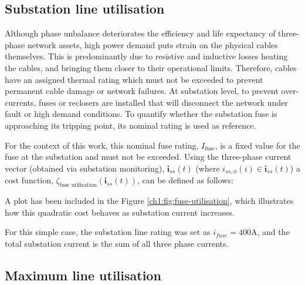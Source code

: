 \subsection{Substation line utilisation}
\label{ch1:subsec:substation-line-utilisation}

Although phase unbalance deteriorates the efficiency and life expectancy of three-phase network assets, high power demand puts strain on the physical cables themselves.
This is predominantly due to resistive and inductive losses heating the cables, and bringing them closer to their operational limits.
Therefore, cables have an assigned thermal rating which must not be exceeded to prevent permanent cable damage or network failures.
At substation level, to prevent over-currents, fuses or reclosers are installed that will disconnect the network under fault or high demand conditions.
To quantify whether the substation fuse is approaching its tripping point, its nominal rating is used as reference.


For the context of this work, this nominal fuse rating, $I_\text{fuse}$, is a fixed value for the fuse at the substation and must not be exceeded.
Using the three-phase current vector (obtained via substation monitoring), $\textbf{i}_{ss}(t)$ (where $i_{ss,\phi}(i) \in \textbf{i}_{ss}(t)$) a cost function, $\zeta_\text{fuse utilisation}(\textbf{i}_{ss}(t))$, can be defined as follows:



A plot has been included in the Figure \ref{ch1:fig:fuse-utilisation}, which illustrates how this quadratic cost behaves as substation current increases.



For this simple case, the substation line rating was set as $i_{fuse}=400\text{A}$, and the total substation current is the sum of all three phase currents.

\subsection{Maximum line utilisation}
\label{ch1:subsec:maximum-line-utilisation}

